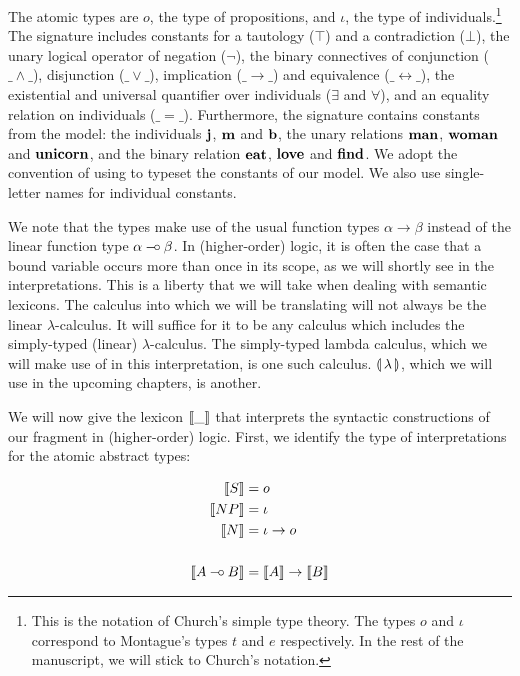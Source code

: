 The atomic types are $o$, the type of propositions, and $\iota$, the type
of individuals.\footnote{This is the notation of Church's simple type
  theory. The types $o$ and $\iota$ correspond to Montague's types $t$ and
  $e$ respectively. In the rest of the manuscript, we will stick to
  Church's notation.} The signature includes constants for a tautology
($\top$) and a contradiction ($\bot$), the unary logical operator of
negation ($\lnot$), the binary connectives of conjunction ($\_ \land \_$),
disjunction ($\_ \lor \_$), implication ($\_ \to \_$) and equivalence
($\_ \leftrightarrow \_$), the existential and universal quantifier over
individuals ($\exists$ and $\forall$), and an equality relation on
individuals ($\_ = \_$). Furthermore, the signature contains constants from
the model: the individuals $\textbf{j}$, $\textbf{m}$ and $\textbf{b}$, the unary
relations $\textbf{man}$, $\textbf{woman}$ and $\textbf{unicorn}$, and the binary
relation $\textbf{eat}$, $\textbf{love}$ and $\textbf{find}$. We adopt the
convention of using  to typeset the constants of our
model. We also use single-letter names for individual constants.

We note that the types make use of the usual function types
$\alpha \to \beta$ instead of the linear function type
$\alpha \mathbin{{-}\mkern-3.5mu{\circ}} \beta$. In (higher-order) logic, it is often the case that a
bound variable occurs more than once in its scope, as we will shortly see
in the interpretations. This is a liberty that we will take when dealing
with semantic lexicons. The calculus into which we will be translating will
not always be the linear $\lambda$-calculus. It will suffice for it to be
any calculus which includes the simply-typed (linear)
$\lambda$-calculus. The simply-typed lambda calculus, which we will make
use of in this interpretation, is one such calculus. ${\llparenthesis \, \lambda \, \rrparenthesis}$, which we will
use in the upcoming chapters, is another.

We will now give the lexicon $\llbracket \_ \rrbracket$ that interprets the syntactic
constructions of our fragment in (higher-order) logic. First, we identify
the type of interpretations for the atomic abstract types:

\begin{align*}
  \llbracket S \rrbracket &= o \\
  \llbracket NP \rrbracket &= \iota \\
  \llbracket N \rrbracket &= \iota \to o \\
  \\
  \llbracket A \mathbin{{-}\mkern-3.5mu{\circ}} B \rrbracket &= \llbracket A \rrbracket \to \llbracket B \rrbracket
\end{align*}

